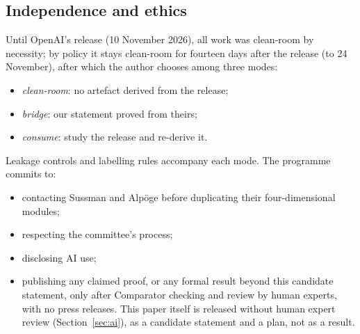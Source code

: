 \documentclass[11pt]{article}
\theoremstyle{definition}
\theoremstyle{remark}
\begin{document}
\subsection{Independence and ethics}
Until OpenAI's release (10 November 2026), all work was clean-room by necessity; by policy it stays
clean-room for fourteen days after the release (to 24 November), after which the author chooses among three modes:
\begin{itemize}[leftmargin=*]
\item \emph{clean-room}: no artefact derived from the release;
\item \emph{bridge}: our statement proved from theirs;
\item \emph{consume}: study the release and re-derive it.
\end{itemize}
Leakage controls and labelling rules accompany each mode. The programme commits to:
\begin{itemize}[leftmargin=*]
\item contacting Sussman and Alp\"oge before duplicating their four-dimensional modules;
\item respecting the committee's process;
\item disclosing AI use;
\item publishing any claimed proof, or any formal result beyond this candidate statement, only
  after Comparator checking and review by human experts, with no press releases. This paper itself
  is released without human expert review (Section~\ref{sec:ai}), as a candidate statement and a
  plan, not as a result.
\end{itemize}

\end{document}
